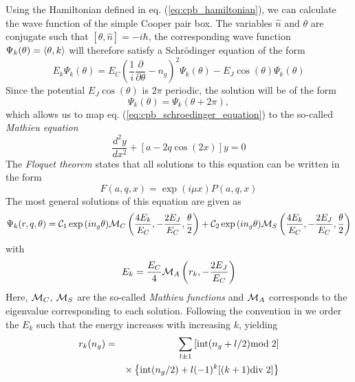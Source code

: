 Using the Hamiltonian defined in eq. (\ref{eq:cpb_hamiltonian}), we can calculate the wave function of the simple Cooper pair box. The variables $\hat{n}$ and $\theta$ are conjugate such that $[\theta,\hat{n}]=-i\hbar$, the corresponding wave function $\Psi_k(\theta) = \left< \theta,k \right>$ will therefore satisfy a Schrödinger equation of the form
%
\begin{equation}
E_k \Psi_k(\theta) = E_C(\frac{1}{i}\frac{\partial}{\partial \theta}-n_g)^2 \Psi_k(\theta) - E_J \cos{\left(\theta\right)}\Psi_k(\theta) \label{eq:cpb_schroedinger_equation}
\end{equation}
%
Since the potential $E_J\cos{(\theta)}$ is $2\pi$ periodic, the solution will be of the form
%
\begin{equation}
\Psi_k(\theta) = \Psi_k(\theta+2\pi),
\end{equation}
%
which allows us to map eq. (\ref{eq:cpb_schroedinger_equation}) to the so-called {\it Mathieu  equation}
%
\begin{equation}
\frac{d^2y}{dx^2}+\left[a-2q\cos{(2x)}\right]y = 0
\end{equation}
%
The {\it Floquet theorem} states that all solutions to this equation can be written in the form
%
\begin{equation}
F(a,q,x) = \exp{\left(i\mu x\right)}P(a,q,x)
\end{equation}
%
The most general solutions of this equation are given as \citep{cottet_implementation_2002}
%
\begin{equation}
\Psi_k(r,q,\theta) = \mcal{C}_1\exp{\left(i n_g \theta \right)}\mcal{M}_C\left(\frac{4E_k}{E_C},-\frac{2E_J}{E_C},\frac{\theta}{2}\right)+\mcal{C}_2\exp{\left(i n_g \theta \right)}\mcal{M}_S \left(\frac{4 E_k}{E_C},-\frac{2 E_J}{E_C},\frac{\theta}{2}\right)
\end{equation}
%
with 
%
\begin{equation}
E_k = \frac{E_C}{4}\mcal{M}_A \left(r_k,-\frac{2 E_J}{E_C} \right)
\end{equation}
%
Here, $\mcal{M}_C$, $\mcal{M}_S$ are the so-called {\it Mathieu functions} and $\mcal{M}_A$ corresponds to the eigenvalue corresponding to each solution. Following the convention in \citep{cottet_implementation_2002} we order the $E_k$ such that the energy increases with increasing $k$, yielding \citep{koch_charge-insensitive_2007}
%
\begin{eqnarray}
r_k(n_g) & = & \sum\limits_{l\pm 1}\left[\mathrm{int}(n_g+l/2)\mathrm{mod}\;2\right] \notag \\
&  & \times\left\{\mathrm{int}(n_g/2)+l(-1)^k[(k+1)\mathrm{div}\;2]\right\}
\end{eqnarray}
%

